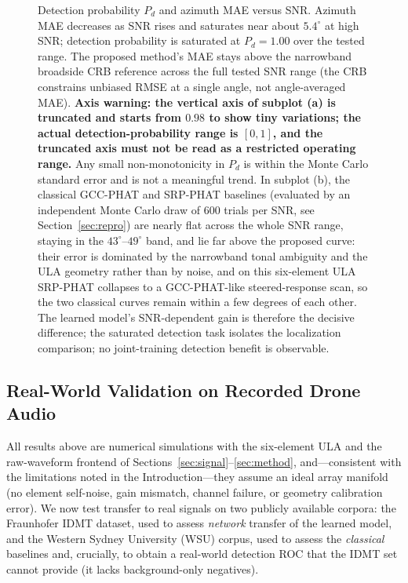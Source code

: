 \documentclass[5p,twocolumn]{elsarticle}
\begin{document}
\begin{figure}[t]
\caption{Detection probability $P_d$ and azimuth MAE versus SNR. Azimuth MAE decreases as SNR rises and saturates near about $5.4^\circ$ at high SNR; detection probability is saturated at $P_d=1.00$ over the tested range. The proposed method's MAE stays above the narrowband broadside CRB reference across the full tested SNR range (the CRB constrains unbiased RMSE at a single angle, not angle-averaged MAE). \textbf{Axis warning: the vertical axis of subplot (a) is truncated and starts from $0.98$ to show tiny variations; the actual detection-probability range is $[0,1]$, and the truncated axis must not be read as a restricted operating range.} Any small non-monotonicity in $P_d$ is within the Monte Carlo standard error and is not a meaningful trend. In subplot (b), the classical GCC-PHAT and SRP-PHAT baselines (evaluated by an independent Monte Carlo draw of 600 trials per SNR, see Section~\ref{sec:repro}) are nearly flat across the whole SNR range, staying in the $43^\circ$--$49^\circ$ band, and lie far above the proposed curve: their error is dominated by the narrowband tonal ambiguity and the ULA geometry rather than by noise, and on this six-element ULA SRP-PHAT collapses to a GCC-PHAT-like steered-response scan, so the two classical curves remain within a few degrees of each other. The learned model's SNR-dependent gain is therefore the decisive difference; the saturated detection task isolates the localization comparison; no joint-training detection benefit is observable.}
\label{fig:snr}
\end{figure}

\subsection{Real-World Validation on Recorded Drone Audio}
\label{sec:real}
All results above are numerical simulations with the six-element ULA and the raw-waveform frontend of Sections~\ref{sec:signal}--\ref{sec:method}, and---consistent with the limitations noted in the Introduction---they assume an ideal array manifold (no element self-noise, gain mismatch, channel failure, or geometry calibration error). We now test transfer to real signals on two publicly available corpora: the Fraunhofer IDMT dataset, used to assess \emph{network} transfer of the learned model, and the Western Sydney University (WSU) corpus, used to assess the \emph{classical} baselines and, crucially, to obtain a real-world detection ROC that the IDMT set cannot provide (it lacks background-only negatives).
\end{document}
